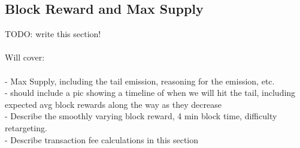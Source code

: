 \subsection{Block Reward and Max Supply}
TODO:  write this section!\\
\\
Will cover:\\
\\
- Max Supply, including the tail emission, reasoning for the emission, etc.\\
- should include a pic showing a timeline of when we will hit the tail, including expected avg block rewards along the way as they decrease\\
- Describe the smoothly varying block reward, 4 min block time, difficulty retargeting.\\
- Describe transaction fee calculations in this section
